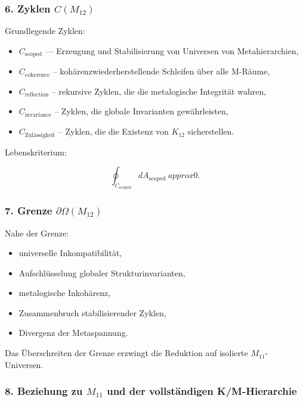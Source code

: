 \subsubsection*{6. Zyklen $C(M_{12})$}

Grundlegende Zyklen:

\begin{itemize}
    \item $C_{\mathrm{scoped}}$ — Erzeugung und Stabilisierung von Universen von Metahierarchien,
    \item $C_{\mathrm{coherence}}$ – kohärenzwiederherstellende Schleifen über alle M-Räume,
    \item $C_{\mathrm{reflection}}$ – rekursive Zyklen, die die metalogische Integrität wahren,
    \item $C_{\mathrm{invariance}}$ – Zyklen, die globale Invarianten gewährleisten,
    \item $C_{\mathrm{Zulässigkeit}}$ – Zyklen, die die Existenz von $K_{12}$ sicherstellen.
\end{itemize}

Lebenskriterium:

\[
\oint_{C_{\mathrm{scoped}}} dA_{\mathrm{scoped}} \ approx 0.
\]

\subsubsection*{7. Grenze $\partial\Omega(M_{12})$}

Nahe der Grenze:

\begin{itemize}
    \item universelle Inkompatibilität,
    \item Aufschlüsselung globaler Strukturinvarianten,
    \item metalogische Inkohärenz,
    \item Zusammenbruch stabilisierender Zyklen,
    \item Divergenz der Metaspannung.
\end{itemize}

Das Überschreiten der Grenze erzwingt die Reduktion auf isolierte $M_{11}$-Universen.

\subsubsection*{8. Beziehung zu $M_{11}$ und der vollständigen K/M-Hierarchie}

